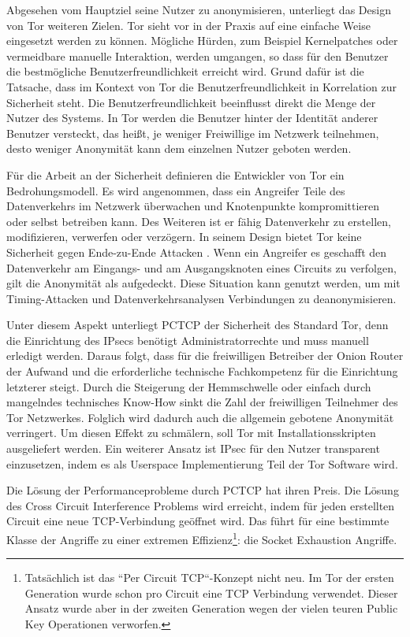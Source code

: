 \documentclass[fleqn,envcountsame,runningheads,10pt,a4paper]{llncs}
\begin{document}
Abgesehen vom Hauptziel seine Nutzer zu anonymisieren, unterliegt das Design von 
Tor weiteren Zielen. Tor sieht vor in der Praxis auf eine einfache Weise 
eingesetzt werden zu können. Mögliche Hürden, zum Beispiel Kernelpatches oder 
vermeidbare manuelle Interaktion, werden umgangen, so dass für den Benutzer die 
bestmögliche Benutzerfreundlichkeit erreicht wird. Grund dafür ist die Tatsache, 
dass im Kontext von Tor die Benutzerfreundlichkeit in Korrelation zur Sicherheit 
steht. Die Benutzerfreundlichkeit beeinflusst direkt die Menge der Nutzer des 
Systems. In Tor werden die Benutzer hinter der Identität anderer Benutzer 
versteckt, das heißt, je weniger Freiwillige im Netzwerk teilnehmen, desto 
weniger Anonymität kann dem einzelnen Nutzer geboten werden.

Für die Arbeit an der Sicherheit definieren die Entwickler von Tor ein 
Bedrohungsmodell. Es wird angenommen, dass ein Angreifer Teile des Datenverkehrs 
im Netzwerk überwachen und Knotenpunkte kompromittieren oder selbst betreiben 
kann. Des Weiteren ist er fähig Datenverkehr zu erstellen, modifizieren, 
verwerfen oder verzögern. In seinem Design bietet Tor keine Sicherheit gegen 
Ende-zu-Ende Attacken \cite{tor}. Wenn ein Angreifer es geschafft den 
Datenverkehr am Eingangs- und am Ausgangsknoten eines Circuits zu verfolgen, 
gilt die Anonymität als aufgedeckt. Diese Situation kann genutzt werden, um mit 
Timing-Attacken und Datenverkehrsanalysen Verbindungen zu deanonymisieren.

Unter diesem Aspekt unterliegt PCTCP der Sicherheit des Standard Tor, denn die 
Einrichtung des IPsecs benötigt Administratorrechte und muss manuell erledigt 
werden. Daraus folgt, dass für die freiwilligen Betreiber der Onion Router der 
Aufwand und die erforderliche technische Fachkompetenz für die Einrichtung 
letzterer steigt. Durch die Steigerung der Hemmschwelle oder einfach durch 
mangelndes technisches Know-How sinkt die Zahl der freiwilligen Teilnehmer des 
Tor Netzwerkes. Folglich wird dadurch auch die allgemein gebotene Anonymität 
verringert. Um diesen Effekt zu schmälern, soll Tor mit Installationsskripten 
ausgeliefert werden. Ein weiterer Ansatz ist IPsec für den Nutzer transparent 
einzusetzen, indem es als Userspace Implementierung Teil der Tor Software wird.

Die Lösung der Performanceprobleme durch PCTCP hat ihren Preis. Die Lösung 
des Cross Circuit Interference Problems wird erreicht, indem für jeden 
erstellten Circuit eine neue TCP-Verbindung geöffnet wird. Das führt für eine 
bestimmte Klasse der Angriffe zu einer extremen Effizienz\footnote{Tatsächlich 
ist das ``Per Circuit TCP``-Konzept nicht neu. Im Tor der ersten Generation 
wurde schon pro Circuit eine TCP Verbindung verwendet. Dieser Ansatz wurde aber 
in der zweiten Generation wegen der vielen teuren Public Key Operationen 
verworfen.\cite{tor}}: die Socket Exhaustion Angriffe. 
\end{document}
